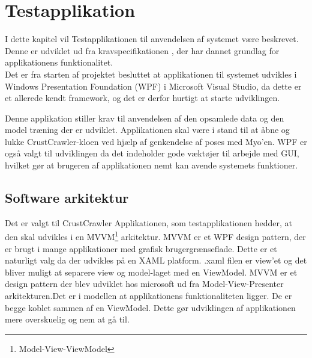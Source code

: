 \thispagestyle{fancy}
\chapter{Testapplikation}
I dette kapitel vil Testapplikationen til anvendelsen af systemet være beskrevet. Denne er udviklet ud fra kravspecifikationen \citep{RefWorks:8}, der har dannet grundlag for applikationens funktionalitet.\\
Det er fra starten af projektet besluttet at applikationen til systemet udvikles i Windows Presentation Foundation (WPF) i Microsoft Visual Studio, da dette er et allerede kendt framework, og det er derfor hurtigt at starte udviklingen.

Denne applikation stiller krav til anvendelsen af den opsamlede data og den model træning der er udviklet. Applikationen skal være i stand til at åbne og lukke CrustCrawler-kloen ved hjælp af genkendelse af poses med Myo'en. WPF er også valgt til udviklingen da det indeholder gode væktøjer til arbejde med GUI, hvilket gør at brugeren af applikationen nemt kan avende systemets funktioner.

\section{Software arkitektur}
Det er valgt til CrustCrawler Applikationen, som testapplikationen hedder, at den skal udvikles i en MVVM\footnote{Model-View-ViewModel} \citep{RefWorks:14} arkitektur. MVVM er et WPF design pattern, der er brugt i mange applikationer med grafisk brugergrænseflade. Dette er et naturligt valg da der udvikles på en XAML platform. .xaml filen er view'et og det bliver muligt at separere view og model-laget med en ViewModel. MVVM er et design pattern der blev udviklet hos microsoft ud fra Model-View-Presenter arkitekturen.Det er i modellen at applikationens funktionaliteten ligger. De er begge koblet sammen af en ViewModel. Dette gør udviklingen af applikationen mere overskuelig og nem at gå til.


